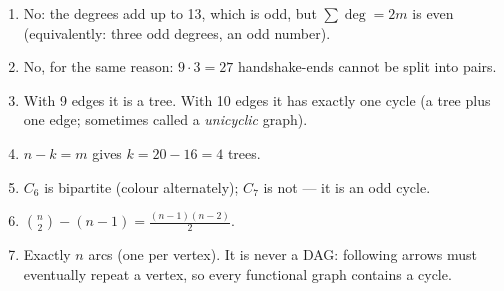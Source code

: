 \begin{solutionbox}[Answers]
\begin{enumerate}[leftmargin=*]
    \item No: the degrees add up to 13, which is odd, but $\sum\deg = 2m$ is even (equivalently: three odd degrees, an odd number).
    \item No, for the same reason: $9\cdot 3=27$ handshake-ends cannot be split into pairs.
    \item With 9 edges it is a tree. With 10 edges it has exactly one cycle (a tree plus one edge; sometimes called a \emph{unicyclic} graph).
    \item $n-k=m$ gives $k=20-16=4$ trees.
    \item $C_6$ is bipartite (colour alternately); $C_7$ is not --- it is an odd cycle.
    \item $\binom n2-(n-1)=\frac{(n-1)(n-2)}{2}$.
    \item Exactly $n$ arcs (one per vertex). It is never a DAG: following arrows must eventually repeat a vertex, so every functional graph contains a cycle.
\end{enumerate}
\end{solutionbox}
